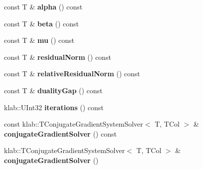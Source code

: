 \begin{DoxyCompactItemize}
\item 
const T \& {\bfseries alpha} () const \hypertarget{classkl1p_1_1TBasisPursuitSolver_a5b9f19b29f6d8591f60bc5b6f34a2e8f}{}\label{classkl1p_1_1TBasisPursuitSolver_a5b9f19b29f6d8591f60bc5b6f34a2e8f}

\item 
const T \& {\bfseries beta} () const \hypertarget{classkl1p_1_1TBasisPursuitSolver_a53177da0be730b3c0f51952eb6a2b62e}{}\label{classkl1p_1_1TBasisPursuitSolver_a53177da0be730b3c0f51952eb6a2b62e}

\item 
const T \& {\bfseries mu} () const \hypertarget{classkl1p_1_1TBasisPursuitSolver_a6fa8b3b05714f3db166dab61a7ecc750}{}\label{classkl1p_1_1TBasisPursuitSolver_a6fa8b3b05714f3db166dab61a7ecc750}

\item 
const T \& {\bfseries residual\+Norm} () const \hypertarget{classkl1p_1_1TBasisPursuitSolver_ab923202f79f0fb19230aa463cf4bc173}{}\label{classkl1p_1_1TBasisPursuitSolver_ab923202f79f0fb19230aa463cf4bc173}

\item 
const T \& {\bfseries relative\+Residual\+Norm} () const \hypertarget{classkl1p_1_1TBasisPursuitSolver_ade8c6cd21c29a8028911e13790f659f0}{}\label{classkl1p_1_1TBasisPursuitSolver_ade8c6cd21c29a8028911e13790f659f0}

\item 
const T \& {\bfseries duality\+Gap} () const \hypertarget{classkl1p_1_1TBasisPursuitSolver_a81a56c29993fb3feef82d3f6b716a009}{}\label{classkl1p_1_1TBasisPursuitSolver_a81a56c29993fb3feef82d3f6b716a009}

\item 
klab\+::\+U\+Int32 {\bfseries iterations} () const \hypertarget{classkl1p_1_1TBasisPursuitSolver_acf53c7752ba2ed1c573e996c1f90cdb7}{}\label{classkl1p_1_1TBasisPursuitSolver_acf53c7752ba2ed1c573e996c1f90cdb7}

\item 
const klab\+::\+T\+Conjugate\+Gradient\+System\+Solver$<$ T, T\+Col $>$ \& {\bfseries conjugate\+Gradient\+Solver} () const \hypertarget{classkl1p_1_1TBasisPursuitSolver_aeb3ea7af0f6f7b814e0c9d95dadc1af4}{}\label{classkl1p_1_1TBasisPursuitSolver_aeb3ea7af0f6f7b814e0c9d95dadc1af4}

\item 
klab\+::\+T\+Conjugate\+Gradient\+System\+Solver$<$ T, T\+Col $>$ \& {\bfseries conjugate\+Gradient\+Solver} ()\hypertarget{classkl1p_1_1TBasisPursuitSolver_aebed416d290328172c6cc5f59a8b03fd}{}\label{classkl1p_1_1TBasisPursuitSolver_aebed416d290328172c6cc5f59a8b03fd}


\end{DoxyCompactItemize}
